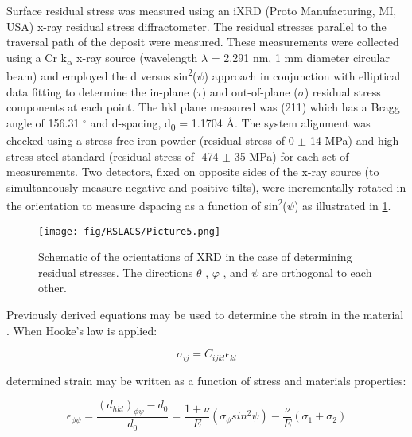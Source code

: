 		Surface residual stress was measured using an iXRD (Proto Manufacturing, MI, USA) x-ray residual stress diffractometer. The residual stresses parallel to the traversal path of the deposit were measured. These measurements were collected using a Cr k\textsubscript{$ \alpha $ } x-ray source (wavelength $ \lambda $  = 2.291 nm, 1 mm diameter circular beam) and employed the d versus sin\textsuperscript{2}($\psi$) approach in conjunction with elliptical data fitting to determine the in-plane ($\tau$) and out-of-plane ($\sigma$) residual stress components at each point. The hkl plane measured was (211) which has a Bragg angle of 156.31 $ ^{\circ} $  and d-spacing, d\textsubscript{0} = 1.1704 Å. The system alignment was checked using a stress-free iron powder (residual stress of 0 $ \pm $  14 MPa) and high-stress steel standard (residual stress of -474 $ \pm $  35 MPa) for each set of measurements. Two detectors, fixed on opposite sides of the x-ray source (to simultaneously measure negative and positive  tilts), were incrementally rotated in the  orientation to measure dspacing as a function of sin\textsuperscript{2}($\psi$) as illustrated in \ref{fig:RSLACS5}. 
		
		
		\begin{figure}
			\centering
			\texttt{[image: fig/RSLACS/Picture5.png]}
			\caption[Schematic of the orientations of XRD in the case of determining residual stresses.]{Schematic of the orientations of XRD in the case of determining residual stresses. The directions $ \theta $ , $ \varphi $ , and $ \psi $  are orthogonal to each other.}
			\label{fig:RSLACS5}
		\end{figure}
		
		
		
		Previously derived equations may be used to determine the strain in the material \cite{RN1385}. When Hooke’s law is applied:
		
		
		\begin{equation}		
		\sigma _{ij}=C_{ijkl} \epsilon _{kl}
		\end{equation}
		
		
		
		determined strain may be written as a function of stress and materials properties:
		
		
		\begin{equation}
		\epsilon _{ \phi  \psi }=\frac{ \left( d_{hkl} \right) _{ \phi  \psi }-d_{0}}{d_{0}}=\frac{1+ \nu }{E} \left(  \sigma _{ \phi }sin^{2} \psi  \right) -\frac{ \nu }{E} \left(  \sigma _{1}+ \sigma _{2} \right)
		\end{equation}
		
